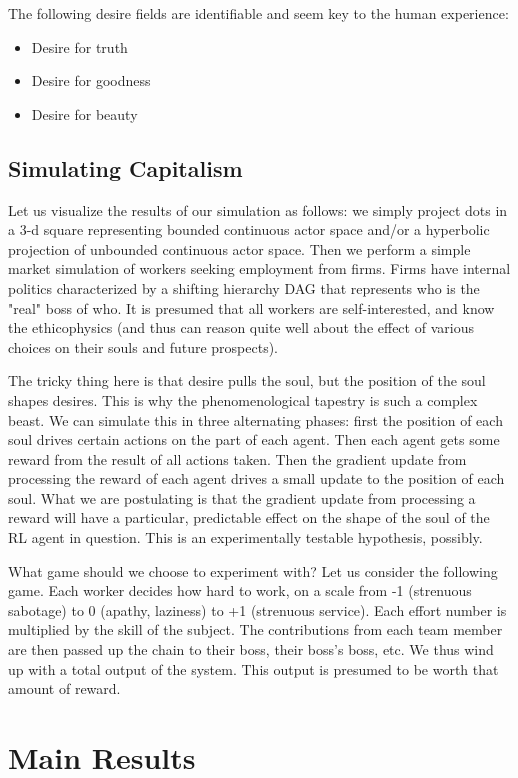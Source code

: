\documentclass{article}
\begin{document}
The following desire fields are identifiable and seem key to the human
experience:
\begin{itemize}
\item Desire for truth
\item Desire for goodness
\item Desire for beauty
\end{itemize}

\subsection{Simulating Capitalism}

Let us visualize the results of our simulation as follows: we simply
project dots in a 3-d square representing bounded continuous actor
space and/or a hyperbolic projection of unbounded continuous actor
space. Then we perform a simple market simulation of workers seeking
employment from firms. Firms have internal politics characterized by a
shifting hierarchy DAG that represents who is the "real" boss of
who. It is presumed that all workers are self-interested, and know the
ethicophysics (and thus can reason quite well about the effect of
various choices on their souls and future prospects).

The tricky thing here is that desire pulls the soul, but the position
of the soul shapes desires. This is why the phenomenological tapestry
is such a complex beast. We can simulate this in three alternating
phases: first the position of each soul drives certain actions on the
part of each agent. Then each agent gets some reward from the result
of all actions taken. Then the gradient update from processing the
reward of each agent drives a small update to the position of each
soul. What we are postulating is that the gradient update from
processing a reward will have a particular, predictable effect on the
shape of the soul of the RL agent in question. This is an
experimentally testable hypothesis, possibly.

What game should we choose to experiment with? Let us consider the
following game. Each worker decides how hard to work, on a scale from
-1 (strenuous sabotage) to 0 (apathy, laziness) to +1 (strenuous
service). Each effort number is multiplied by the skill of the
subject. The contributions from each team member are then passed up
the chain to their boss, their boss's boss, etc. We thus wind up with
a total output of the system. This output is presumed to be worth that
amount of reward.

\section{Main Results}
\end{document}
